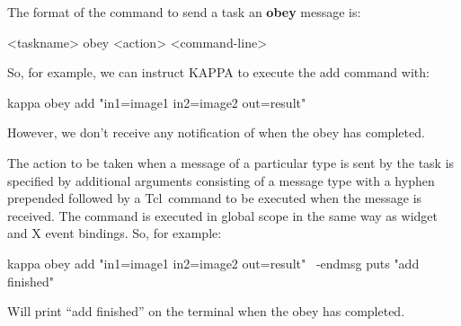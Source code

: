 \documentclass[twoside,11pt,nolof]{starlink}
\providecommand{\Tcl}{{\textsf{Tcl}}}
\begin{document}
The format of the command to send a task an \textbf{obey} message is:
\begin{terminalv}
<taskname> obey <action> <command-line>
\end{terminalv}
So, for example, we can instruct KAPPA to execute the add command with:
\begin{terminalv}
kappa obey add "in1=image1 in2=image2 out=result"
\end{terminalv}
However, we don't receive any notification of when the obey has
completed.

The action to be taken when a message of a particular type is sent by the
task is specified by additional arguments consisting of a message type
with a hyphen prepended followed by a \Tcl\ command to be executed when the
message is received. The command is executed in global scope in the same
way as widget and X event bindings. So, for example:
\begin{terminalv}
kappa obey add "in1=image1 in2=image2 out=result" \
    -endmsg {puts "add finished"}
\end{terminalv}
Will print ``add finished'' on the terminal when the obey has completed.
\end{document}
